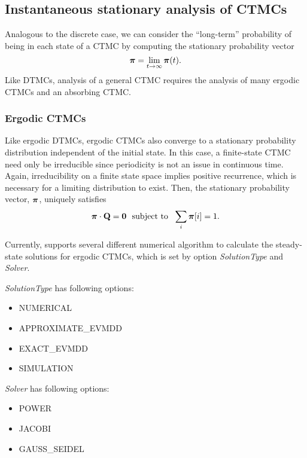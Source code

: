 \subsection{Instantaneous stationary analysis of CTMCs}
Analogous to the discrete case, we can consider the ``long-term'' probability
of being in each state of a CTMC by computing the
stationary probability vector
\[
\mbox{\boldmath{${\pi}$}} = \lim_{t \rightarrow \infty} \mbox{\boldmath{${\pi}$}}(t).
\]
Like DTMCs, analysis of a general CTMC requires the analysis of many
ergodic CTMCs and an absorbing CTMC.

\subsubsection{Ergodic CTMCs}

Like ergodic DTMCs, ergodic CTMCs also converge to a
stationary probability distribution
independent of the initial state.
In this case, a finite-state CTMC need only be
irreducible since periodicity is not an issue
in continuous time.  Again, irreducibility on a finite state space
implies positive recurrence, which is necessary for a limiting distribution to exist.
Then, the stationary probability vector, $\mbox{\boldmath{${\pi}$}}$, uniquely satisfies
\[
  \gvect{\pi} \cdot \Q = \0 \ \text{ subject to }\ \sum_{i} \gvect{\pi}[i] = 1.
\]


Currently, {\smart} supports several different numerical algorithm to calculate the steady-state solutions
for ergodic CTMCs, which is set by option \emph{SolutionType} and \emph{Solver}.

\emph{SolutionType} has following options:
\begin{itemize}
\item NUMERICAL
\item APPROXIMATE\_EVMDD
\item EXACT\_EVMDD
\item SIMULATION
\end{itemize}

\emph{Solver} has following options:
\begin{itemize}
\item POWER
\item JACOBI
\item GAUSS\_SEIDEL
\end{itemize}

